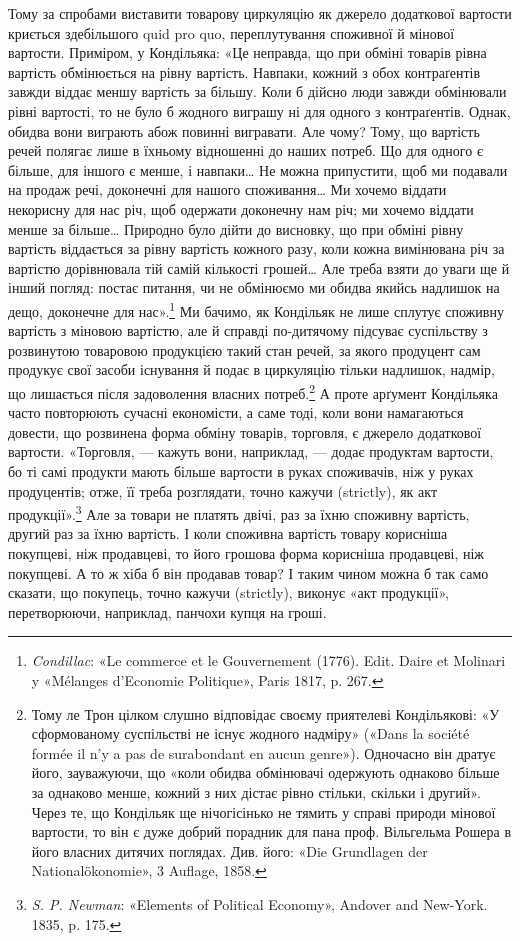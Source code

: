 Тому за спробами виставити товарову циркуляцію як джерело
додаткової вартости криється здебільшого quid pro quo, переплутування
споживної й мінової вартости. Приміром, у Кондільяка:
«Це неправда, що при обміні товарів рівна вартість обмінюється
на рівну вартість. Навпаки, кожний з обох контраґентів завжди
віддає меншу вартість за більшу. Коли б дійсно люди завжди
обмінювали рівні вартості, то не було б жодного виграшу ні для
одного з контраґентів. Однак, обидва вони виграють абож повинні
вигравати. Але чому? Тому, що вартість речей полягає
лише в їхньому відношенні до наших потреб. Що для одного є
більше, для іншого є менше, і навпаки\dots{} Не можна припустити,
щоб ми подавали на продаж речі, доконечні для нашого споживання\dots{}
Ми хочемо віддати некорисну для нас річ, щоб одержати
доконечну нам річ; ми хочемо віддати менше за більше\dots{} Природно
було дійти до висновку, що при обміні рівну вартість віддається
за рівну вартість кожного разу, коли кожна вимінювана
річ за вартістю дорівнювала тій самій кількості грошей\dots{} Але
треба взяти до уваги ще й інший погляд: постає питання, чи не
обмінюємо ми обидва якийсь надлишок на дещо, доконечне для
нас».\footnote{
\emph{Condillac}: «Le commerce et le Gouvernement (1776). Edit. Daire
et Molinari y «Mélanges d’Economie Politique», Paris 1817, p. 267.
} Ми бачимо, як Кондільяк не лише сплутує споживну
вартість з міновою вартістю, але й справді по-дитячому підсуває
суспільству з розвинутою товаровою продукцією такий стан речей,
за якого продуцент сам продукує свої засоби існування й подає
в циркуляцію тільки надлишок, надмір, що лишається після
задоволення власних потреб.\footnote{
Тому ле Трон цілком слушно відповідає своєму приятелеві Кондільякові:
«У сформованому суспільстві не існує жодного надміру»
(«Dans la société formée il n’y a pas de surabondant en aucun genre»).
Одночасно він дратує його, зауважуючи, що «коли обидва обмінювачі
одержують однаково більше за однаково менше, кожний з них дістає
рівно стільки, скільки і другий». Через те, що Кондільяк ще нічогісінько
не тямить у справі природи мінової вартости, то він є дуже добрий порадник
для пана проф. Вільгельма Рошера в його власних дитячих поглядах.
Див. його: «Die Grundlagen der Nationalökonomie», 3 Auflage,
1858.
} А проте арґумент Кондільяка
часто повторюють сучасні економісти, а саме тоді, коли вони
намагаються довести, що розвинена форма обміну товарів, торговля,
є джерело додаткової вартости. «Торговля, — кажуть вони,
наприклад, — додає продуктам вартости, бо ті самі продукти
мають більше вартости в руках споживачів, ніж у руках продуцентів;
отже, її треба розглядати, точно кажучи (strictly), як
акт продукції».\footnote{
\emph{S. P. Newman}: «Elements of Political Economy», Andover and
New-York. 1835, p. 175.
} Але за товари не платять двічі, раз за їхню
споживну вартість, другий раз за їхню вартість. І коли споживна
вартість товару корисніша покупцеві, ніж продавцеві, то його
грошова форма корисніша продавцеві, ніж покупцеві. А то ж
хіба б він продавав товар? І таким чином можна б так само сказати,
що покупець, точно кажучи (strictly), виконує «акт продукції»,
перетворюючи, наприклад, панчохи купця на гроші.

